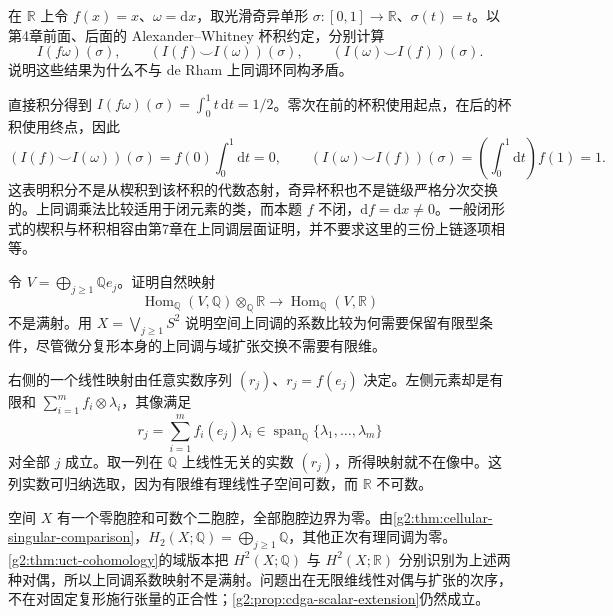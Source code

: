 \begin{exercise}\label{g2:ex:integration-not-multiplicative}
	在 \(\mathbb R\) 上令 \(f(x)=x\)、\(\omega=\mathrm dx\)，取光滑奇异单形 \(\sigma:[0,1]\to\mathbb R\)、\(\sigma(t)=t\)。以第4章前面、后面的 Alexander--Whitney 杯积约定，分别计算
	\[
		I(f\omega)(\sigma),\qquad (I(f)\smile I(\omega))(\sigma),\qquad
		(I(\omega)\smile I(f))(\sigma).
	\]
	说明这些结果为什么不与 de Rham 上同调环同构矛盾。
\end{exercise}
\begin{solution}
	直接积分得到 \(I(f\omega)(\sigma)=\int_0^1t\,\mathrm dt=1/2\)。零次在前的杯积使用起点，在后的杯积使用终点，因此
	\[
		(I(f)\smile I(\omega))(\sigma)=f(0)\int_0^1\mathrm dt=0,
	\qquad
		(I(\omega)\smile I(f))(\sigma)=\left(\int_0^1\mathrm dt\right)f(1)=1.
	\]
	这表明积分不是从楔积到该杯积的代数态射，奇异杯积也不是链级严格分次交换的。上同调乘法比较适用于闭元素的类，而本题 \(f\) 不闭，\(\mathrm df=\mathrm dx\ne0\)。一般闭形式的楔积与杯积相容由第7章在上同调层面证明，并不要求这里的三份上链逐项相等。
\end{solution}

\begin{exercise}\label{g2:ex:infinite-coefficient-extension}
	令 \(V=\bigoplus_{j\geq1}\mathbb Q e_j\)。证明自然映射
	\[
		\operatorname{Hom}_{\mathbb Q}(V,\mathbb Q)\otimes_{\mathbb Q}\mathbb R
		\longrightarrow\operatorname{Hom}_{\mathbb Q}(V,\mathbb R)
	\]
	不是满射。用 \(X=\bigvee_{j\geq1}S^2\) 说明空间上同调的系数比较为何需要保留有限型条件，尽管微分复形本身的上同调与域扩张交换不需要有限维。
\end{exercise}
\begin{solution}
	右侧的一个线性映射由任意实数序列 \((r_j)\)、\(r_j=f(e_j)\) 决定。左侧元素却是有限和 \(\sum_{i=1}^m f_i\otimes\lambda_i\)，其像满足
	\[
		r_j=\sum_{i=1}^m f_i(e_j)\lambda_i\in\operatorname{span}_{\mathbb Q}\{\lambda_1,\ldots,\lambda_m\}
	\]
	对全部 \(j\) 成立。取一列在 \(\mathbb Q\) 上线性无关的实数 \((r_j)\)，所得映射就不在像中。这列实数可归纳选取，因为有限维有理线性子空间可数，而 \(\mathbb R\) 不可数。

	空间 \(X\) 有一个零胞腔和可数个二胞腔，全部胞腔边界为零。由\cref{g2:thm:cellular-singular-comparison}，\(H_2(X;\mathbb Q)=\bigoplus_{j\geq1}\mathbb Q\)，其他正次有理同调为零。\cref{g2:thm:uct-cohomology}的域版本把 \(H^2(X;\mathbb Q)\) 与 \(H^2(X;\mathbb R)\) 分别识别为上述两种对偶，所以上同调系数映射不是满射。问题出在无限维线性对偶与扩张的次序，不在对固定复形施行张量的正合性；\cref{g2:prop:cdga-scalar-extension}仍然成立。
\end{solution}

